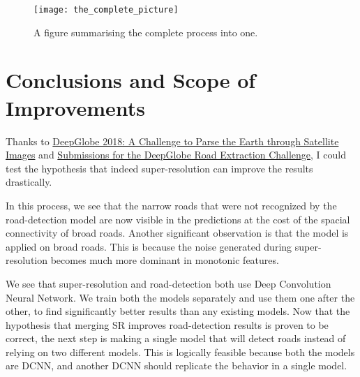 \begin{sidewaysfigure}
  \centering
  \texttt{[image: the\_complete\_picture]}
  \caption{A figure summarising the complete process into one.}
  \label{fig:the_complete_picture}
\end{sidewaysfigure}

\chapter{Conclusions and Scope of Improvements}

Thanks to \href{https://arxiv.org/pdf/1805.06561.pdf}{DeepGlobe 2018: A Challenge to Parse the Earth through Satellite Images} and \href{http://openaccess.thecvf.com/content_cvpr_2018_workshops/papers/w4/Zhou_D-LinkNet_LinkNet_With_CVPR_2018_paper.pdf}{Submissions for the DeepGlobe Road Extraction Challenge}, I could test the hypothesis that indeed super-resolution can improve the results drastically.

In this process, we see that the narrow roads that were not recognized by the road-detection model are now visible in the predictions at the cost of the spacial connectivity of broad roads. Another significant observation is that the model is applied on broad roads. This is because the noise generated during super-resolution becomes much more dominant in monotonic features.

We see that super-resolution and road-detection both use Deep Convolution Neural Network. We train both the models separately and use them one after the other, to find significantly better results than any existing models. Now that the hypothesis that merging SR improves road-detection results is proven to be correct, the next step is making a single model that will detect roads instead of relying on two different models. This is logically feasible because both the models are DCNN, and another DCNN should replicate the behavior in a single model.

\pagebreak
